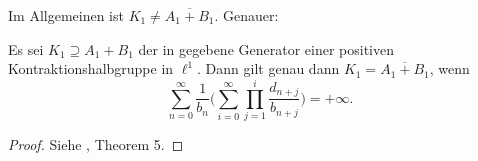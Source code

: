 

\begin{bem}
Im Allgemeinen ist $K_1\neq\overline{A_1+B_1}$. Genauer: 
\par Es sei $K_1\supseteq A_1+B_1$ der in  gegebene Generator einer positiven Kontraktionshalbgruppe in $\ell^1$. Dann gilt genau dann $K_1=\overline{A_1+B_1}$, wenn
\begin{equation*}
\sum_{n=0}^\infty \frac{1}{b_n}\Bigg(\sum_{i=0}^\infty\prod_{j=1}^i\frac{d_{n+j}}{b_{n+j}}\Bigg) = +\infty.
\end{equation*}
\end{bem}

\begin{proof}
Siehe \cite{banasiak_2004}, Theorem 5.
\end{proof}








